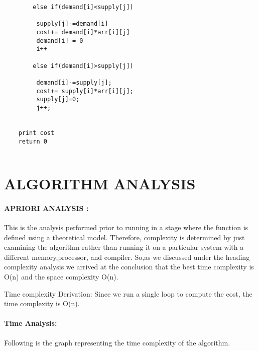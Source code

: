 \documentclass[10pt]{article}
\begin{document}
\begin{multicols*}{2}
\begin{lstlisting}
		else if(demand[i]<supply[j])
		
		 supply[j]-=demand[i]
		 cost+= demand[i]*arr[i][j]
		 demand[i] = 0
		 i++
				
		else if(demand[i]>supply[j])
		
		 demand[i]-=supply[j];
		 cost+= supply[i]*arr[i][j];
		 supply[j]=0;
		 j++;

	
	print cost
    return 0


\end{lstlisting}
    

\section*{ALGORITHM ANALYSIS} 
	
\paragraph{APRIORI ANALYSIS :}
This is the analysis performed prior to running in a stage where the function is defined using a theoretical model. Therefore, complexity is determined by just examining the algorithm rather than running it on a particular system with a different memory,processor, and compiler. So,as we discussed under the heading complexity analysis we arrived at the conclusion that the best time complexity is O(n) and the space complexity O(n).

Time complexity Derivation: Since we run a single loop to compute the cost, the time complexity is O(n).

\paragraph{Time Analysis:}Following is the graph representing the time complexity of the algorithm.\\\\\\


\end{multicols*}
\end{document}
